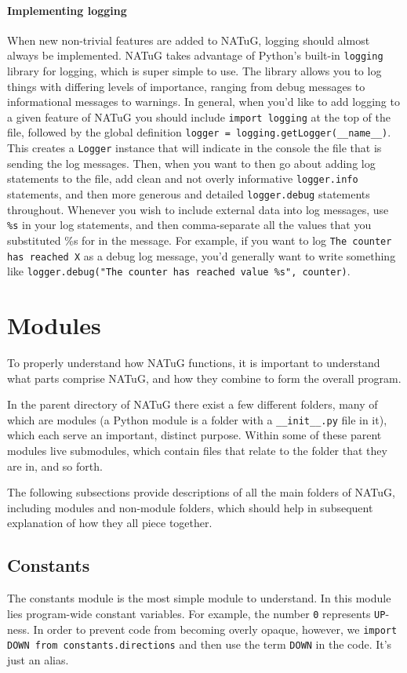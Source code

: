 \documentclass[titlepage]{article}
\begin{document}
	\paragraph{Implementing logging}
	When new non-trivial features are added to NATuG, logging should almost always be implemented. NATuG takes advantage of Python's built-in \texttt{logging} library for logging, which is super simple to use. The library allows you to log things with differing levels of importance, ranging from debug messages to informational messages to warnings. In general, when you'd like to add logging to a given feature of NATuG you should include \texttt{import logging} at the top of the file, followed by the global definition \texttt{logger = logging.getLogger(\_\_name\_\_)}. This creates a \texttt{Logger} instance that will indicate in the console the file that is sending the log messages. Then, when you want to then go about adding log statements to the file, add clean and not overly informative \texttt{logger.info} statements, and then more generous and detailed \texttt{logger.debug} statements throughout. Whenever you wish to include external data into log messages, use \texttt{\%s} in your log statements, and then comma-separate all the values that you substituted \%s for in the message. For example, if you want to log \texttt{The counter has reached X} as a debug log message, you'd generally want to write something like \texttt{logger.debug("The counter has reached value \%s", counter)}.
	
	\section{Modules}
	To properly understand how NATuG functions, it is important to understand what parts comprise NATuG, and how they combine to form the overall program.
	
	In the parent directory of NATuG there exist a few different folders, many of which are modules (a Python module is a folder with a \texttt{\_\_init\_\_.py} file in it), which each serve an important, distinct purpose. Within some of these parent modules live submodules, which contain files that relate to the folder that they are in, and so forth.
	
	The following subsections provide descriptions of all the main folders of NATuG, including modules and non-module folders, which should help in subsequent explanation of how they all piece together.
	
	\subsection{Constants}
	The constants module is the most simple module to understand. In this module lies program-wide constant variables. For example, the number \texttt{0} represents \texttt{UP}-ness. In order to prevent code from becoming overly opaque, however, we \texttt{import DOWN from constants.directions} and then use the term \texttt{DOWN} in the code. It's just an alias.
	
\end{document}

